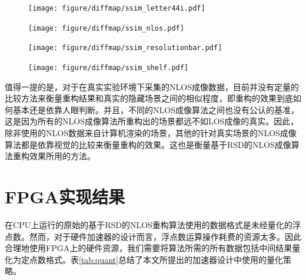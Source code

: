\documentclass[master]{shtthesis}             %
\begin{document}
\begin{figure}[!tb]
  \centering
  \texttt{[image: figure/diffmap/ssim\_letter44i.pdf]}
  \label{fig:ssim_l44i}
\end{figure}

\begin{figure}[!tb]
  \centering
  \texttt{[image: figure/diffmap/ssim\_nlos.pdf]}
  \label{fig:ssim_nlos}
\end{figure}

\begin{figure}[!tb]
  \centering
  \texttt{[image: figure/diffmap/ssim\_resolutionbar.pdf]}
  \label{fig:ssim_resolutionbar}
\end{figure}

\begin{figure}[!tb]
  \centering
  \texttt{[image: figure/diffmap/ssim\_shelf.pdf]}
  \label{fig:ssim_shelf}
\end{figure}

值得一提的是，对于在真实实验环境下采集的NLOS成像数据，目前并没有定量的比较方法来衡量重构结果和真实的隐藏场景之间的相似程度，即重构的效果到底如何基本还是依靠人眼判断。并且，不同的NLOS成像算法之间也没有公认的基准，这是因为所有的NLOS成像算法所重构出的场景都远不如LOS成像的真实。因此，除非使用的NLOS数据来自计算机渲染的场景，其他的针对真实场景的NLOS成像算法都是依靠视觉的比较来衡量重构的效果。这也是衡量基于RSD的NLOS成像算法重构效果所用的方法\citep{Liu,Liu2019}。

\section{FPGA实现结果}

在CPU上运行的原始的基于RSD的NLOS重构算法使用的数据格式是未经量化的浮点数。然而，对于硬件加速器的设计而言，浮点数运算操作耗费的资源太多。因此合理地使用FPGA上的硬件资源，我们需要将算法所需的所有数据包括中间结果量化为定点数格式。表\ref{tab:quant}总结了本文所提出的加速器设计中使用的量化策略。
\end{document}
